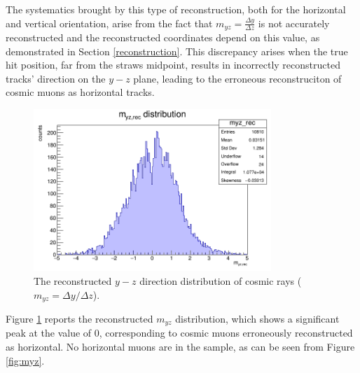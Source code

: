 The systematics brought by this type of reconstruction, both for 
the horizontal and vertical orientation, arise from the fact that $m_{yz}=\frac{\Delta y}{\Delta z}$ 
is not accurately reconstructed and the reconstructed coordinates depend on this 
value, as demonstrated in Section \ref{reconstruction}. 
This discrepancy arises when the true hit position, far from the straws midpoint, 
results in incorrectly reconstructed tracks' direction on the $y-z$ plane, leading to the erroneous 
reconstruciton of cosmic muons as horizontal tracks.
\begin{figure}[!h]
    \centering
    \includegraphics[width=0.8\textwidth]{figures/png/myz_rec.png}
    \caption[The reconstructed $y-z$ direction distribution of cosmic rays.]{The reconstructed $y-z$ direction distribution of cosmic rays ($m_{yz}=\Delta y /\Delta z$).}
    \label{fig:myzrec}
  \end{figure}
Figure \ref{fig:myzrec} reports the reconstructed $m_{yz}$ distribution, which shows 
a significant peak at the value of 0, corresponding to cosmic muons erroneously 
reconstructed as horizontal. 
No horizontal muons are in the sample, as can be seen from Figure \ref{fig:myz}.


